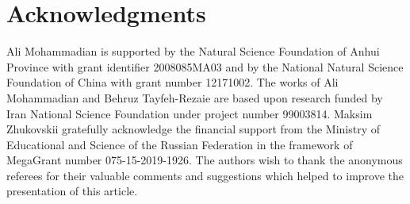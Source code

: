 \documentclass[hidelinks, 11pt]{article}
\theoremstyle{plain}
\theoremstyle{definition}
\begin{document}
\section*{Acknowledgments}


Ali Mohammadian  is supported by the    Natural Science Foundation of Anhui Province  with  grant identifier 2008085MA03 and by the National Natural Science Foundation of China with  grant number 12171002.
The works   of Ali Mohammadian  and  Behruz Tayfeh-Rezaie  are  based upon research funded by Iran  National  Science Foundation   under project number  99003814.
Maksim Zhukovskii gratefully acknowledge the financial support from the Ministry of Educational and Science of the Russian Federation in the framework of MegaGrant number  075-15-2019-1926.
The authors wish  to thank the anonymous referees for their valuable comments and  suggestions which helped to improve the presentation of this article.
\end{document}
